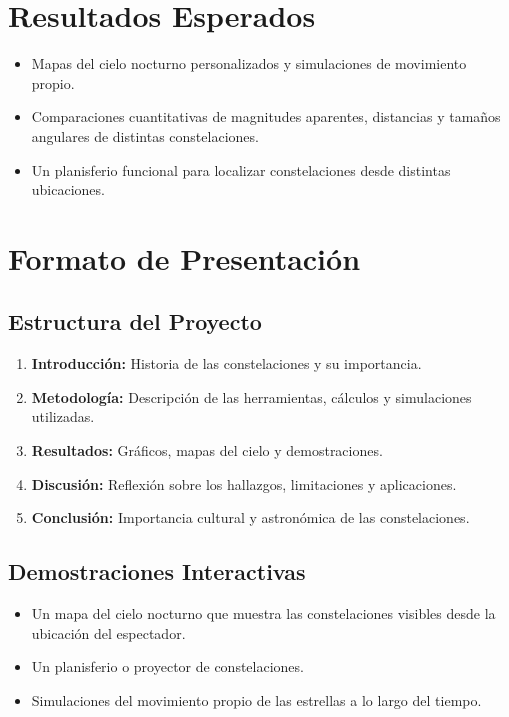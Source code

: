 \documentclass[12pt]{article}
\begin{document}
\section*{Resultados Esperados}
\begin{itemize}
    \item Mapas del cielo nocturno personalizados y simulaciones de movimiento propio.
    \item Comparaciones cuantitativas de magnitudes aparentes, distancias y tama\~nos angulares de distintas constelaciones.
    \item Un planisferio funcional para localizar constelaciones desde distintas ubicaciones.
\end{itemize}

\section*{Formato de Presentaci\'on}
\subsection*{Estructura del Proyecto}
\begin{enumerate}
    \item \textbf{Introducci\'on:} Historia de las constelaciones y su importancia.
    \item \textbf{Metodolog\'ia:} Descripci\'on de las herramientas, c\'alculos y simulaciones utilizadas.
    \item \textbf{Resultados:} Gr\'aficos, mapas del cielo y demostraciones.
    \item \textbf{Discusi\'on:} Reflexi\'on sobre los hallazgos, limitaciones y aplicaciones.
    \item \textbf{Conclusi\'on:} Importancia cultural y astron\'omica de las constelaciones.
\end{enumerate}

\subsection*{Demostraciones Interactivas}
\begin{itemize}
    \item Un mapa del cielo nocturno que muestra las constelaciones visibles desde la ubicaci\'on del espectador.
    \item Un planisferio o proyector de constelaciones.
    \item Simulaciones del movimiento propio de las estrellas a lo largo del tiempo.
\end{itemize}
\end{document}
